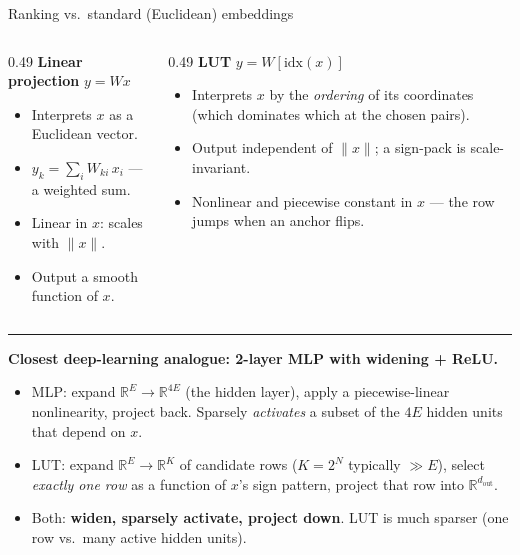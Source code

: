 \documentclass[aspectratio=169]{beamer}
\newcommand{\R}{\mathbb{R}}
\newcommand{\dout}{d_{\mathrm{out}}}
\begin{document}
\begin{frame}{Ranking vs.\ standard (Euclidean) embeddings}

\begin{columns}[T,onlytextwidth]
\begin{column}{0.49\textwidth}
\textbf{Linear projection} \( y = W x \)
\begin{itemize}
\item Interprets \(x\) as a Euclidean vector.
\item \(y_k = \sum_i W_{ki}\, x_i\) --- a weighted sum.
\item Linear in \(x\): scales with \(\|x\|\).
\item Output a smooth function of \(x\).
\end{itemize}
\end{column}
\begin{column}{0.49\textwidth}
\textbf{LUT} \( y = W[\mathrm{idx}(x)] \)
\begin{itemize}
\item Interprets \(x\) by the \emph{ordering} of its coordinates (which dominates which at the chosen pairs).
\item Output independent of \(\|x\|\); a sign-pack is scale-invariant.
\item Nonlinear and piecewise constant in \(x\) --- the row jumps when an anchor flips.
\end{itemize}
\end{column}
\end{columns}

\vspace{0.8em}
\hrule
\vspace{0.5em}
\textbf{Closest deep-learning analogue: 2-layer MLP with widening + ReLU.}

\medskip
\begin{itemize}
\item MLP: expand \(\R^E \to \R^{4E}\) (the hidden layer), apply a piecewise-linear nonlinearity, project back. Sparsely \emph{activates} a subset of the \(4E\) hidden units that depend on \(x\).
\item LUT: expand \(\R^E \to \R^{K}\) of candidate rows (\(K = 2^N\) typically \(\gg E\)), select \emph{exactly one row} as a function of \(x\)'s sign pattern, project that row into \(\R^{\dout}\).
\item Both: \textbf{widen, sparsely activate, project down}. LUT is much sparser (one row vs.\ many active hidden units).
\end{itemize}
\end{frame}
\end{document}
